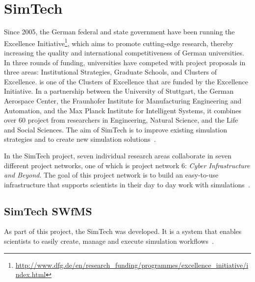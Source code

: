 \section{SimTech}
\label{fundamentals:simtech}

Since 2005, the German federal and state government have been running the Excellence Initiative\footnote{\url{http://www.dfg.de/en/research_funding/programmes/excellence_initiative/index.html}}, which aims to promote cutting-edge research, thereby increasing the quality and international competitiveness of German universities.
In three rounds of funding, universities have competed with project proposals in three areas: Institutional Strategies, Graduate Schools, and Clusters of Excellence.
 is one of the Clusters of Excellence that are funded by the Excellence Initiative.
In a partnership between the University of Stuttgart, the German Aerospace Center, the Fraunhofer Institute for Manufacturing Engineering and Automation, and the Max Planck Institute for Intelligent Systems, it combines over 60 project from researchers in Engineering, Natural Science, and the Life and Social Sciences.
The aim of SimTech is to improve existing simulation strategies and to create new simulation solutions~\autocite{excellence:glance}.

In the SimTech project, seven individual research areas collaborate in seven different project networks, one of which is project network 6: \textit{Cyber Infrastructure and Beyond}.
The goal of this project network is to build an easy-to-use infrastructure that supports scientists in their day to day work with simulations~\autocite{simtech:projectnetwork6}.

\subsection{SimTech SWfMS}

As part of this project, the SimTech  was developed.
It is a system that enables scientists to easily create, manage and execute simulation workflows~\autocite{workflow:simulation:flexibility}.

